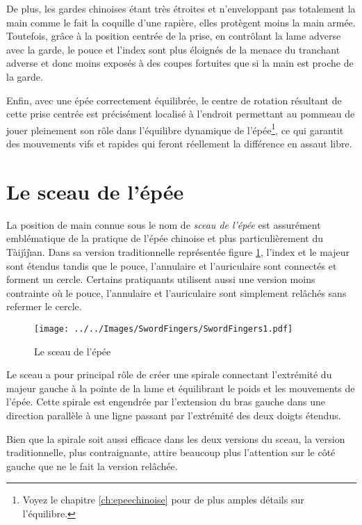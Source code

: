 De plus, les gardes chinoises étant très étroites et n'enveloppant pas totalement la main comme le fait la coquille d'une rapière, elles protègent moins la main armée.
Toutefois, grâce à la position centrée de la prise, en contrôlant la lame adverse avec la garde, le pouce et l'index sont plus éloignés de la menace du tranchant adverse et donc moins exposés à des coupes fortuites que si la main est proche de la garde.

Enfin, avec une épée correctement équilibrée, le centre de rotation résultant de cette prise centrée est précisément localisé à l'endroit permettant au pommeau de jouer pleinement son rôle dans l'équilibre dynamique de l'épée\footnote{Voyez le chapitre \ref*{ch:epeechinoise} pour de plus amples détails sur l'équilibre.}, ce qui garantit des mouvements vifs et rapides qui feront réellement la différence en assaut libre.

\section{Le sceau de l'épée}
La position de main connue sous le nom de \emph{sceau de l'épée} est assurément emblématique de la pratique de l'épée chinoise et plus particulièrement du T\`{a}ij\'{\i}j\`{\i}an.
Dans sa version traditionnelle représentée figure \ref{fig:swordfingers}, l'index et le majeur sont étendus tandis que le pouce, l'annulaire et l'auriculaire sont connectés et forment un cercle. 
Certains pratiquants utilisent aussi une version moins contrainte où le pouce, l'annulaire et l'auriculaire sont simplement relâchés sans refermer le cercle. 

\begin{figure}[ht]
	\centering
	\texttt{[image: ../../Images/SwordFingers/SwordFingers1.pdf]}
	\caption[Le sceau de l'épée]{Le sceau de l'épée}
	\label{fig:swordfingers}
\end{figure}

Le sceau a pour principal rôle de créer une spirale connectant l'extrémité du majeur gauche à la pointe de la lame et équilibrant le poids et les mouvements de l'épée.
Cette spirale est engendrée par l'extension du bras gauche dans une direction parallèle à une ligne passant par l'extrémité des deux doigts étendus.

Bien que la spirale soit aussi efficace dans les deux versions du sceau, la version traditionnelle, plus contraignante, attire beaucoup plus l'attention sur le côté gauche que ne le fait la version relâchée.

